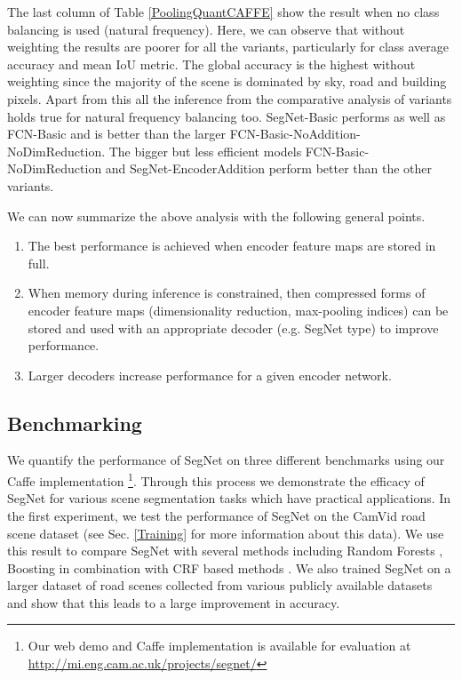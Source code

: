 The last column of Table \ref{PoolingQuantCAFFE} show the result when no class balancing is used (natural frequency). Here, we can observe that without weighting the results are poorer for all the variants, particularly for class average accuracy and mean IoU metric. The global accuracy is the highest without weighting since the majority of the scene is dominated by sky, road and building pixels. Apart from this all the inference from the comparative analysis of variants holds true for natural frequency balancing too. SegNet-Basic performs as well as FCN-Basic and is better than the larger FCN-Basic-NoAddition-NoDimReduction. The bigger but less efficient models FCN-Basic-NoDimReduction and SegNet-EncoderAddition perform better than the other variants.

We can now summarize the above analysis with the following general points.
\begin{enumerate}
\item The best performance is achieved when encoder feature maps are stored in full.
\item When memory during inference is constrained, then compressed forms of encoder feature maps (dimensionality reduction, max-pooling indices) can be stored and used with an appropriate decoder (e.g. SegNet type) to improve performance.
\item Larger decoders increase performance for a given encoder network.
\end{enumerate}



\subsection{Benchmarking}
\label{Benchmarking}
We quantify the performance of SegNet on three different benchmarks using our Caffe implementation \footnote{Our web demo and Caffe implementation is available for evaluation at \url{http://mi.eng.cam.ac.uk/projects/segnet/}}. Through this process we demonstrate the efficacy of SegNet for various scene segmentation tasks which have practical applications. In the first experiment, we test the performance of SegNet on the CamVid road scene dataset (see Sec. \ref{Training} for more information about this data). We use this result to compare SegNet with several methods including Random Forests \citep{Jamie2}, Boosting \citep{Jamie2,Sturgess} in combination with CRF based methods \citep{LadickyECCV}.  We also trained SegNet on a larger dataset of road scenes collected from various publicly available datasets \citep{brostow2009semantic,LabelMe,SpanishKITTI} and show that this leads to a large improvement in accuracy.

